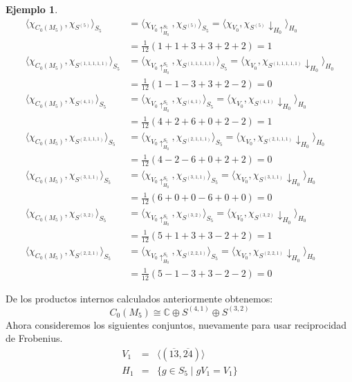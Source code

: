 \documentclass[12pt]{book}
\theoremstyle{definition}
\newtheorem{example}[theorem]{Ejemplo}
\newcounter{in}
\begin{document}
\begin{example}
{\scriptsize
  \begin{align*}
    \langle\chi_{C_{0}(M_{5})},\chi_{S^{(5)}}\rangle_{S_{5}}&=\langle\chi_{V_{0}\uparrow^{S_{5}}_{H_0}},\chi_{S^{(5)}}\rangle_{S_{5}}=\langle\chi_{V_{0}},\chi_{S^{(5)}}\downarrow_{H_{0}}\rangle_{H_{0}}\\ 
    &=\frac{1}{12}(1+1+3+3+2+2)=1\\ 
    \langle\chi_{C_{0}(M_{5})},\chi_{S^{(1,1,1,1,1)}}\rangle_{S_{5}}&=\langle\chi_{V_{0}\uparrow^{S_{5}}_{H_0}},\chi_{S^{(1,1,1,1,1)}}\rangle_{S_{5}}=\langle\chi_{V_{0}},\chi_{S^{(1,1,1,1,1)}}\downarrow_{H_{0}}\rangle_{H_{0}}\\
    &=\frac{1}{12}(1-1-3+3+2-2)=0 \\
    \langle\chi_{C_{0}(M_{5})},\chi_{S^{(4,1)}}\rangle_{S_{5}}&=\langle\chi_{V_{0}\uparrow^{S_{5}}_{H_0}},\chi_{S^{(4,1)}}\rangle_{S_{5}}=\langle\chi_{V_{0}},\chi_{S^{(4,1)}}\downarrow_{H_{0}}\rangle_{H_{0}}\\
    &=\frac{1}{12}(4+2+6+0+2-2)=1 \\
    \langle\chi_{C_{0}(M_{5})},\chi_{S^{(2,1,1,1)}}\rangle_{S_{5}}&=\langle\chi_{V_{0}\uparrow^{S_{5}}_{H_0}},\chi_{S^{(2,1,1,1)}}\rangle_{S_{5}}=\langle\chi_{V_{0}},\chi_{S^{(2,1,1,1)}}\downarrow_{H_{0}}\rangle_{H_{0}}\\
    &=\frac{1}{12}(4-2-6+0+2+2)=0 \\
    \langle\chi_{C_{0}(M_{5})},\chi_{S^{(3,1,1)}}\rangle_{S_{5}}&=\langle\chi_{V_{0}\uparrow^{S_{5}}_{H_0}},\chi_{S^{(3,1,1)}}\rangle_{S_{5}}=\langle\chi_{V_{0}},\chi_{S^{(3,1,1)}}\downarrow_{H_{0}}\rangle_{H_{0}}\\
    &=\frac{1}{12}(6+0+0-6+0+0)=0 \\
    \langle\chi_{C_{0}(M_{5})},\chi_{S^{(3,2)}}\rangle_{S_{5}}&=\langle\chi_{V_{0}\uparrow^{S_{5}}_{H_0}},\chi_{S^{(3,2)}}\rangle_{S_{5}}=\langle\chi_{V_{0}},\chi_{S^{(3,2)}}\downarrow_{H_{0}}\rangle_{H_{0}}\\
    &=\frac{1}{12}(5+1+3+3-2+2)=1 \\
    \langle\chi_{C_{0}(M_{5})},\chi_{S^{(2,2,1)}}\rangle_{S_{5}}&=\langle\chi_{V_{0}\uparrow^{S_{5}}_{H_0}},\chi_{S^{(2,2,1)}}\rangle_{S_{5}}=\langle\chi_{V_{0}},\chi_{S^{(2,2,1)}}\downarrow_{H_{0}}\rangle_{H_{0}}\\
    &=\frac{1}{12}(5-1-3+3-2-2)=0 
  \end{align*}}

De los productos internos calculados anteriormente obtenemos:
\begin{equation}
  \label{eq:C0-M5}
  C_{0}(M_{5})\cong \mathbb{C}\oplus S^{(4,1)} \oplus S^{(3,2)} 
\end{equation}
Ahora consideremos los siguientes conjuntos, nuevamente para usar
reciprocidad de Frobenius.
\begin{eqnarray*}
  V_{1}&=&\langle(\overline{13},\overline{24})\rangle\\
  H_{1}&=&\{g\in S_{5}\mid gV_{1}=V_{1}\}
\end{eqnarray*}


\end{example}
\end{document}
